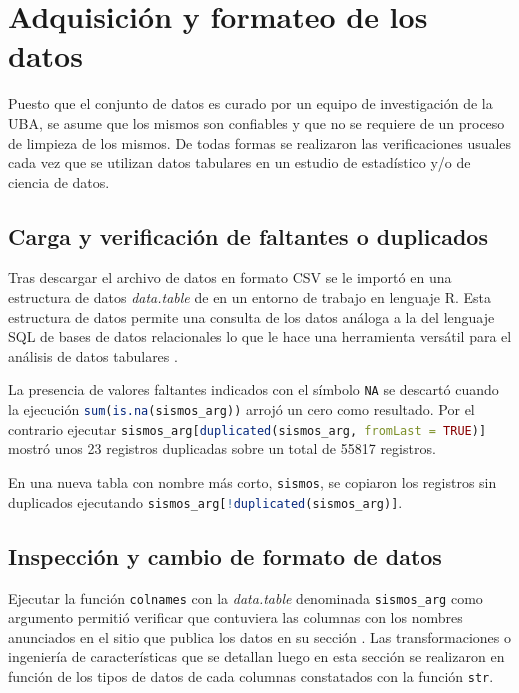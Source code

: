 \documentclass[a4paper]{report}
\begin{document}
\section{Adquisición y formateo de los datos}

Puesto que el conjunto de datos es curado por un equipo de investigación de la UBA, se asume que los mismos son confiables y que no se requiere de un proceso de limpieza de los mismos.
De todas formas se realizaron las verificaciones usuales cada vez que se utilizan datos tabulares en un estudio de estadístico y/o de ciencia de datos.


\subsection{Carga y verificación de faltantes o duplicados}
Tras descargar el archivo de datos en formato CSV se le importó en una estructura de datos \emph{data.table} de en un entorno de trabajo en lenguaje R.
Esta estructura de datos permite una consulta de los datos análoga a la del lenguaje SQL de bases de datos relacionales lo que le hace una herramienta versátil para el análisis de datos tabulares \cite{noauthor_introduction_2024}.

La presencia de valores faltantes indicados con el símbolo \verb'NA' se descartó cuando la ejecución \lstinline[language = R]'sum(is.na(sismos_arg))' arrojó un cero como resultado.
Por el contrario ejecutar \lstinline[language = R]!sismos_arg[duplicated(sismos_arg, fromLast = TRUE)]! mostró unos \num{23} registros duplicadas sobre un total de \num{55817} registros.

En una nueva tabla con nombre más corto, \lstinline[language = R]'sismos', se copiaron los registros sin duplicados ejecutando \lstinline[language = R]'sismos_arg[!duplicated(sismos_arg)]'.


\subsection{Inspección y cambio de formato de datos}\label{sec:formateo}
Ejecutar la función \lstinline[language = R]'colnames' con la \emph{data.table} denominada \lstinline[language = R]'sismos_arg' como argumento permitió verificar que contuviera las columnas con los nombres anunciados en el sitio que publica los datos en su sección \cite[Exploración inicial]{daniela_parada_ic-datasets-docencia_nodate}.
Las transformaciones o ingeniería de características que se detallan luego en esta sección se realizaron en función de los tipos de datos de cada columnas constatados con la función \lstinline[language = R]'str'.
\end{document}
